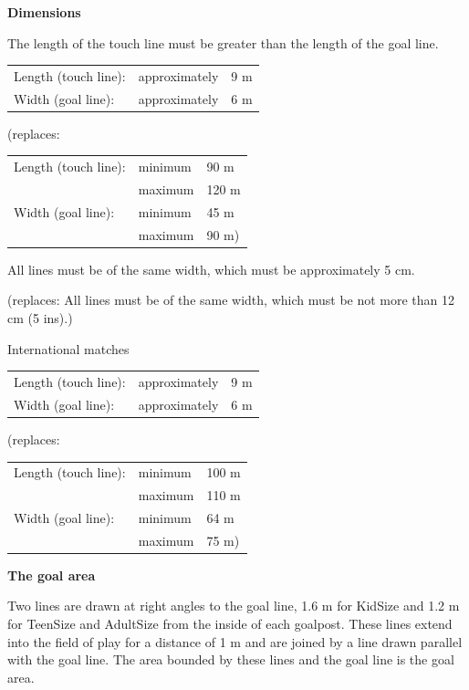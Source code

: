 \bigskip

{\textbf{Dimensions}}

\headlinebox

The length of the touch line must be greater than the length of the goal line. 

\bigskip

\begin{tabular}{lll}
Length (touch line): &approximately &9 m \\
Width (goal line): &approximately &6 m
\end{tabular}

{\color[rgb]{0.4,0.4,0.4}
(replaces:

\begin{tabular}{lll}
Length (touch line): &minimum &90 m \\
&maximum &120 m \\
Width (goal line): &minimum &45 m \\
&maximum &90 m)
\end{tabular}
}

\bigskip

All lines must be of the same width, which must be approximately 5 cm. 

{\color[rgb]{0.4,0.4,0.4}
(replaces: All lines must be of the same width, which must be not more than 12 cm (5 ins).)}


\bigskip

International matches 

\begin{tabular}{lll}
Length (touch line): &approximately &9 m \\
Width (goal line): &approximately &6 m
\end{tabular}

{\color[rgb]{0.4,0.4,0.4}
(replaces: 

\begin{tabular}{lll}
Length (touch line): &minimum &100 m \\
&maximum &110 m \\
Width (goal line): &minimum &64 m \\
&maximum &75 m)
\end{tabular}
}

\bigskip

{\bfseries The goal area }

\headlinebox

Two lines are drawn at right angles to the goal line, 1.6 m for KidSize and 1.2 m for TeenSize and AdultSize from the inside of each goalpost. These lines extend into the field of play for a distance of 1 m and are joined by a line drawn parallel with the goal line. The area bounded by these lines and the goal line is the goal area. 


